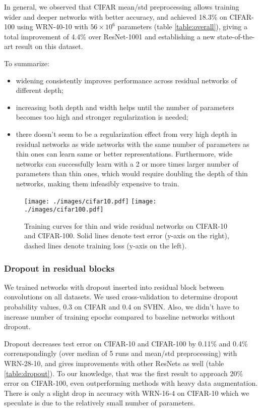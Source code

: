 \documentclass{bmvc2k}
\begin{document}
In general,  we  observed that CIFAR mean/std preprocessing  allows training wider and deeper networks with better accuracy, and achieved 18.3\% on CIFAR-100 using WRN-40-10 with $56\times10^6$ parameters (table \ref{table:overall}), giving a total improvement of 4.4\% over ResNet-1001 and establishing a new state-of-the-art result on this dataset.


To summarize:
\begin{itemize}
  \item{widening consistently improves performance across residual networks of different depth;}
  \item{increasing both depth and width helps until the number of parameters becomes too high and stronger regularization is needed;}
  \item{there doesn't seem to be a regularization effect from very high depth in residual networks as wide networks with the same number of parameters as thin ones can learn same or better representations. Furthermore, wide networks can successfully learn with a 2 or more times larger number of parameters than thin ones, which would require doubling the depth of thin networks, making them infeasibly expensive to train.}
\end{itemize}

\begin{figure}
  \centering
\texttt{[image: ./images/cifar10.pdf]}
  \texttt{[image: ./images/cifar100.pdf]} \caption{Training curves for thin and wide residual networks on CIFAR-10 and CIFAR-100. Solid lines denote test error (y-axis on the right), dashed lines denote training loss (y-axis on the left).}
\label{fig:cifar}
\end{figure}


\subsubsection*{Dropout in  residual blocks} We trained networks with dropout inserted into residual block between convolutions on all datasets. We used cross-validation to determine dropout probability values, 0.3 on CIFAR and 0.4 on SVHN. Also, we didn't have to increase number of training epochs compared to baseline networks without dropout.

Dropout decreases test error on CIFAR-10 and CIFAR-100 by 0.11\% and 0.4\% correnspondingly (over median of 5 runs and mean/std preprocessing) with WRN-28-10, and gives improvements with other ResNets as well (table \ref{table:dropout}). To our knowledge, that was the first result to approach 20\% error on CIFAR-100, even outperforming methods with heavy data augmentation. There is only a slight drop in accuracy with WRN-16-4 on CIFAR-10 which we speculate is due to the relatively small number of parameters.
\end{document}
